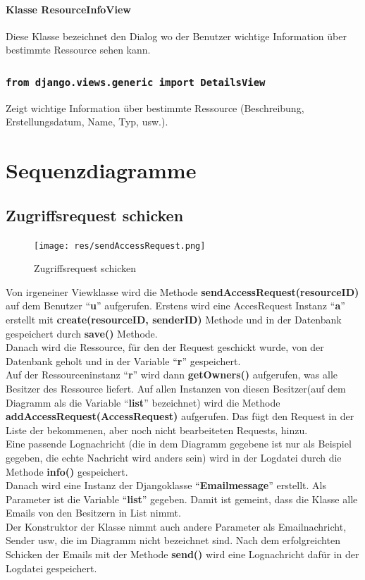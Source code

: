 \documentclass[parskip=full,11pt]{scrartcl}
\newcommand{\class}[1]{\subsubsection*{\lstinline[basicstyle=\ttfamily\large]{#1}}}
\begin{document}
\paragraph*{Klasse ResourceInfoView}
Diese Klasse bezeichnet den Dialog wo der Benutzer wichtige Information über bestimmte Ressource sehen kann.
\class{from django.views.generic import DetailsView}
Zeigt wichtige Information über bestimmte Ressource (Beschreibung, Erstellungsdatum, Name, Typ, usw.).
\newpage
 \section{Sequenzdiagramme}
 \subsection{Zugriffsrequest schicken}
 \begin{figure}[ht!]
 	\centering
 	\texttt{[image: res/sendAccessRequest.png]}
 	\caption{Zugriffsrequest schicken}
 	\label{fig:sendAccReq}
 \end{figure}
 
Von irgeneiner Viewklasse wird die Methode \textbf{sendAccessRequest(resourceID)} auf dem Benutzer \enquote{\textbf{u}}  aufgerufen. Erstens wird eine AccesRequest Instanz \enquote{\textbf{a}} erstellt mit \textbf{create(resourceID, senderID)} Methode und in der Datenbank gespeichert durch \textbf{save()} Methode. \\Danach wird die Ressource, für den der Request geschickt wurde, von der Datenbank geholt und in der Variable \enquote{\textbf{r}} gespeichert.\\Auf der Ressourceninstanz \enquote{\textbf{r}} wird dann \textbf{getOwners()} aufgerufen, was alle Besitzer des Ressource liefert. Auf allen Instanzen von diesen Besitzer(auf dem Diagramm als die Variable \enquote{\textbf{list}} bezeichnet) wird die Methode \textbf{addAccessRequest(AccessRequest)} aufgerufen. Das fügt den Request in der Liste der bekommenen, aber noch nicht bearbeiteten Requests, hinzu.\\Eine passende Lognachricht (die in dem Diagramm gegebene ist nur als Beispiel gegeben, die echte Nachricht wird anders sein) wird in der Logdatei durch die Methode \textbf{info()} gespeichert.\\Danach wird eine Instanz der Djangoklasse \enquote{\textbf{Emailmessage}} erstellt. Als Parameter ist die Variable \enquote{\textbf{list}} gegeben. Damit ist gemeint, dass die Klasse alle Emails von den Besitzern in List nimmt.\\Der Konstruktor der Klasse nimmt auch andere Parameter als Emailnachricht, Sender usw, die im Diagramm nicht bezeichnet sind. Nach dem erfolgreichten Schicken der Emails mit der Methode \textbf{send()} wird eine Lognachricht dafür in der Logdatei gespeichert. 
 
\end{document}
